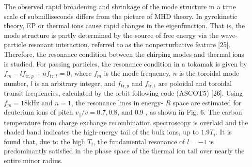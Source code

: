 \documentclass[oneside,onecolumn]{article}
\begin{document}
\begin{sloppypar}
 The observed rapid broadening and shrinkage of the mode structure in a time scale of submilliseconds differs from the picture of MHD theory. In gyrokinetic theory, EP or thermal ions cause rapid changes in the eigenfunction. That is, the mode structure is partly determined by the source of free energy via the wave-particle resonant interaction, referred to as the nonperturbative feature [25]. Therefore, the resonance condition between the chirping modes and thermal ions is studied. For passing particles, the resonance condition in a tokamak is given by $f_{m}-l f_{\mathrm{tr}, p}+n f_{\mathrm{tr}, t}=0$, where $f_{m}$ is the mode frequency, $n$ is the toroidal mode number, $l$ is an arbitrary integer, and $f_{\mathrm{tr}, p}$ and $f_{\mathrm{tr}, t}$ are poloidal and toroidal transit frequencies, calculated by the orbit following code (ASCOT5) [26]. Using $f_{m}=18 \mathrm{kHz}$ and $n=1$, the resonance lines in energy- $R$ space are estimated for deuterium ions of pitch $v_{\|} / v=0.7,0.8$, and 0.9 , as shown in Fig. 6. The carbon temperature from charge exchange recombination spectroscopy is overlaid and the shaded band indicates the high-energy tail of the bulk ions, up to $1.9 T_{i}$. It is found that, due to the high $T_{i}$, the fundamental resonance of $l=-1$ is predominantly satisfied in the phase space of the thermal ion tail over nearly the entire minor radius.
 

\end{sloppypar}
\end{document}
